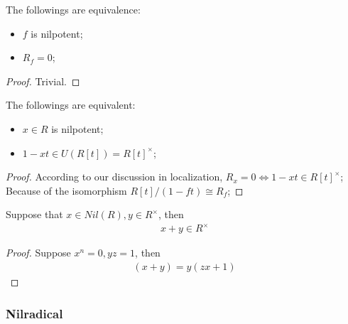 \documentclass[Total.tex]{subfiles}
\begin{document}
						\begin{lemma}
						The followings are equivalence:
						\begin{itemize}
							\item $f$ is nilpotent;
							\item $R_f=0$;
						\end{itemize}
					\end{lemma}
					\begin{proof}
						Trivial. 
					\end{proof}
					
					\begin{lemma}
						The followings are equivalent:
						\begin{itemize}
							\item $x\in R$ is nilpotent;
							\item $1-xt\in U(R[t])=R[t]^\times$;
						\end{itemize}
					\end{lemma}
					\begin{proof}
						According to our discussion in localization, $R_x=0\Leftrightarrow 1-xt\in R[t]^\times$; Because of the isomorphism $R[t]/(1-ft)\cong R_f$;
					\end{proof}
					
					\begin{proposition}
						Suppose that $x\in Nil(R),y\in R^\times$, then
						\begin{gather*}
							x+y\in R^\times
						\end{gather*}
					\end{proposition}
					\begin{proof}
						Suppose $x^n=0,yz=1$, then
						\begin{gather*}
							(x+y)=y(zx+1) 
						\end{gather*}
					\end{proof}
					\subsubsection{Nilradical}
					
\end{document}
